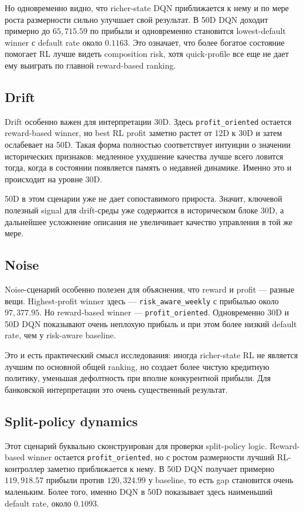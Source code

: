 \documentclass[12pt,a4paper]{article}
\begin{document}
Но одновременно видно, что richer-state DQN приближается к нему и по мере роста размерности сильно улучшает свой результат. В 50D DQN доходит примерно до $65{,}715.59$ по прибыли и одновременно становится lowest-default winner с default rate около $0.1163$. Это означает, что более богатое состояние помогает RL лучше видеть composition risk, хотя quick-profile все еще не дает ему выиграть по главной reward-based ranking.

\subsection{Drift}

Drift особенно важен для интерпретации 30D. Здесь \texttt{profit\_oriented} остается reward-based winner, но best RL profit заметно растет от 12D к 30D и затем ослабевает на 50D. Такая форма полностью соответствует интуиции о значении исторических признаков: медленное ухудшение качества лучше всего ловится тогда, когда в состоянии появляется память о недавней динамике. Именно это и происходит на уровне 30D.

50D в этом сценарии уже не дает сопоставимого прироста. Значит, ключевой полезный signal для drift-среды уже содержится в историческом блоке 30D, а дальнейшее усложнение описания не увеличивает качество управления в той же мере.

\subsection{Noise}

Noise-сценарий особенно полезен для объяснения, что reward и profit --- разные вещи. Highest-profit winner здесь --- \texttt{risk\_aware\_weekly} с прибылью около $97{,}377.95$. Но reward-based winner --- \texttt{profit\_oriented}. Одновременно 30D и 50D DQN показывают очень неплохую прибыль и при этом более низкий default rate, чем у risk-aware baseline.

Это и есть практический смысл исследования: иногда richer-state RL не является лучшим по основной общей ranking, но создает более чистую кредитную политику, уменьшая дефолтность при вполне конкурентной прибыли. Для банковской интерпретации это очень существенный результат.

\subsection{Split-policy dynamics}

Этот сценарий буквально сконструирован для проверки split-policy logic. Reward-based winner остается \texttt{profit\_oriented}, но с ростом размерности лучший RL-контроллер заметно приближается к нему. В 50D DQN получает примерно $119{,}918.57$ прибыли против $120{,}324.99$ у baseline, то есть gap становится очень маленьким. Более того, именно DQN в 50D показывает здесь наименьший default rate, около $0.1093$.
\end{document}
